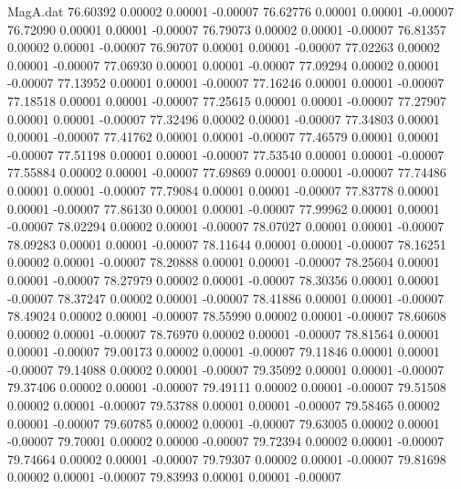 \begin{filecontents}{MagA.dat}
  76.60392    0.00002    0.00001   -0.00007
  76.62776    0.00001    0.00001   -0.00007
  76.72090    0.00001    0.00001   -0.00007
  76.79073    0.00002    0.00001   -0.00007
  76.81357    0.00002    0.00001   -0.00007
  76.90707    0.00001    0.00001   -0.00007
  77.02263    0.00002    0.00001   -0.00007
  77.06930    0.00001    0.00001   -0.00007
  77.09294    0.00002    0.00001   -0.00007
  77.13952    0.00001    0.00001   -0.00007
  77.16246    0.00001    0.00001   -0.00007
  77.18518    0.00001    0.00001   -0.00007
  77.25615    0.00001    0.00001   -0.00007
  77.27907    0.00001    0.00001   -0.00007
  77.32496    0.00002    0.00001   -0.00007
  77.34803    0.00001    0.00001   -0.00007
  77.41762    0.00001    0.00001   -0.00007
  77.46579    0.00001    0.00001   -0.00007
  77.51198    0.00001    0.00001   -0.00007
  77.53540    0.00001    0.00001   -0.00007
  77.55884    0.00002    0.00001   -0.00007
  77.69869    0.00001    0.00001   -0.00007
  77.74486    0.00001    0.00001   -0.00007
  77.79084    0.00001    0.00001   -0.00007
  77.83778    0.00001    0.00001   -0.00007
  77.86130    0.00001    0.00001   -0.00007
  77.99962    0.00001    0.00001   -0.00007
  78.02294    0.00002    0.00001   -0.00007
  78.07027    0.00001    0.00001   -0.00007
  78.09283    0.00001    0.00001   -0.00007
  78.11644    0.00001    0.00001   -0.00007
  78.16251    0.00002    0.00001   -0.00007
  78.20888    0.00001    0.00001   -0.00007
  78.25604    0.00001    0.00001   -0.00007
  78.27979    0.00002    0.00001   -0.00007
  78.30356    0.00001    0.00001   -0.00007
  78.37247    0.00002    0.00001   -0.00007
  78.41886    0.00001    0.00001   -0.00007
  78.49024    0.00002    0.00001   -0.00007
  78.55990    0.00002    0.00001   -0.00007
  78.60608    0.00002    0.00001   -0.00007
  78.76970    0.00002    0.00001   -0.00007
  78.81564    0.00001    0.00001   -0.00007
  79.00173    0.00002    0.00001   -0.00007
  79.11846    0.00001    0.00001   -0.00007
  79.14088    0.00002    0.00001   -0.00007
  79.35092    0.00001    0.00001   -0.00007
  79.37406    0.00002    0.00001   -0.00007
  79.49111    0.00002    0.00001   -0.00007
  79.51508    0.00002    0.00001   -0.00007
  79.53788    0.00001    0.00001   -0.00007
  79.58465    0.00002    0.00001   -0.00007
  79.60785    0.00002    0.00001   -0.00007
  79.63005    0.00002    0.00001   -0.00007
  79.70001    0.00002    0.00000   -0.00007
  79.72394    0.00002    0.00001   -0.00007
  79.74664    0.00002    0.00001   -0.00007
  79.79307    0.00002    0.00001   -0.00007
  79.81698    0.00002    0.00001   -0.00007
  79.83993    0.00001    0.00001   -0.00007

\end{filecontents}
